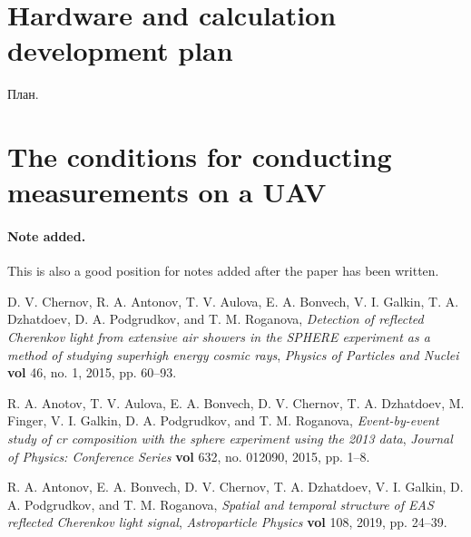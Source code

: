 \documentclass[a4paper,11pt]{article}
\begin{document}
\section{Hardware and calculation development plan}

План.

\section{The conditions for conducting measurements on a UAV}







\paragraph{Note added.} This is also a good position for notes added
after the paper has been written.



\begin{thebibliography}{99}

D. V. Chernov, R. A. Antonov, T. V. Aulova, E. A. Bonvech, V. I. Galkin, T. A. Dzhatdoev, D. A. Podgrudkov, and T. M. Roganova, \emph{Detection of reflected Cherenkov light from extensive air showers in the SPHERE experiment as a method of studying superhigh energy cosmic rays}, \emph{Physics of Particles and Nuclei} {\bf vol} 46, no. 1, 2015, pp. 60–93.

R. A. Anotov, T. V. Aulova, E. A. Bonvech, D. V. Chernov, T. A. Dzhatdoev, M. Finger, V. I. Galkin, D. A. Podgrudkov, and T. M. Roganova, \emph{Event-by-event study of cr composition with the sphere experiment using the 2013 data}, \emph{Journal of Physics: Conference Series} {\bf vol} 632, no. 012090, 2015, pp. 1–8.

R. A. Antonov, E. A. Bonvech, D. V. Chernov, T. A. Dzhatdoev, V. I. Galkin, D. A. Podgrudkov, and T. M. Roganova, \emph{Spatial and temporal structure of EAS reflected Cherenkov light signal}, \emph{Astroparticle Physics} {\bf vol} 108, 2019, pp. 24–39.





\end{thebibliography}
\end{document}
